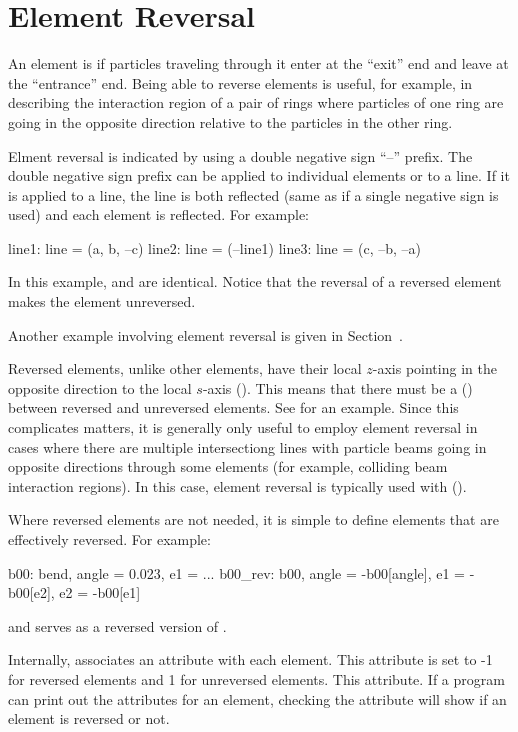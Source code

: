 \section{Element Reversal}
\label{s:ele.reverse}

An element is  if particles traveling through it enter at
the ``exit'' end and leave at the ``entrance'' end. Being able to
reverse elements is useful, for example, in describing the interaction
region of a pair of rings where particles of one ring are going in the
opposite direction relative to the particles in the other ring.

Elment reversal is indicated by using a double negative sign ``--''
prefix. The double negative sign prefix can be applied to individual
elements or to a line. If it is applied to a line, the line is both
reflected (same as if a single negative sign is used) and each element
is reflected. For example:
\begin{example}
  line1: line = (a, b, --c)
  line2: line = (--line1)
  line3: line = (c, --b, --a)
\end{example}
In this example,  and  are identical. Notice that
the reversal of a reversed element makes the element unreversed.

Another example involving element reversal is given in Section~.

Reversed elements, unlike other elements, have their local $z$-axis pointing in the
opposite direction to the local $s$-axis (). This means that there
must be a  () between reversed and unreversed
elements. See  for an example. Since this complicates matters, it is
generally only useful to employ element reversal in cases where there are multiple
intersectiong lines with particle beams going in opposite directions through some elements
(for example, colliding beam interaction regions). In this case, element reversal is
typically used with  ().

Where reversed elements are not needed, it is simple to define elements that are
effectively reversed. For example:
\begin{example}
  b00: bend, angle = 0.023, e1 = ...
  b00_rev: b00, angle = -b00[angle], e1 = -b00[e2], e2 = -b00[e1]
\end{example}
and  serves as a reversed version of .

Internally, \bmad associates an  attribute with each element. This
attribute is set to -1 for reversed elements and 1 for unreversed elements. This
attribute. If a program can print out the attributes for an element, checking the
 attribute will show if an element is reversed or not.

